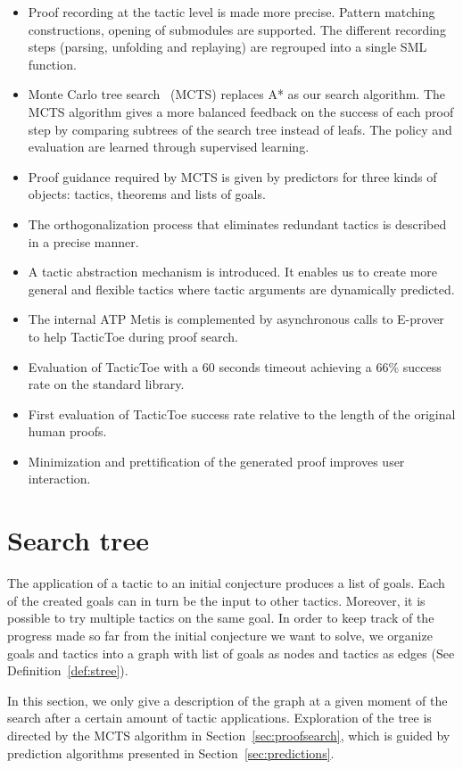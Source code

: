 \documentclass[runningheads,a4paper,draft]{svjour3}
\def\eprover{\textsf{E-prover}\xspace}
\def\sml{\textsf{SML}\xspace}
\def\metis{\textsf{Metis}\xspace}
\def\tactictoe{\textsf{TacticToe}\xspace}
\begin{document}
\begin{itemize}
\item Proof recording at the tactic level is made more precise. Pattern
matching constructions, opening of submodules are supported. The different
recording steps (parsing, unfolding and replaying) are regrouped into a single
\sml function.
\item Monte Carlo tree search~\cite{montecarlo} (MCTS) replaces A* as our
search algorithm. The MCTS algorithm gives a more balanced feedback on
the success of
each proof step by
comparing subtrees of the search tree instead of leafs. The policy and
evaluation are learned
through supervised learning.
\item Proof guidance required by MCTS is given by predictors for
three kinds of objects: tactics, theorems and lists of goals.
\item The orthogonalization process that eliminates redundant tactics is
described in a precise manner.
\item A tactic abstraction mechanism is introduced. It enables us to create
more general and flexible tactics where tactic arguments are dynamically
predicted.
\item The internal ATP \metis is complemented
by asynchronous calls to \eprover to help \tactictoe during proof search.
\item Evaluation of \tactictoe with a 60 seconds timeout achieving a 66\%
success rate on the standard library.
\item First evaluation of \tactictoe success rate relative to
the length of the original human proofs.
\item Minimization and prettification of the generated proof improves user
interaction.
\end{itemize}


\section{Search tree}\label{sec:prelim}

The application of a tactic to an initial conjecture produces a list of goals.
Each of the created goals can in turn be the input to other tactics.
Moreover, it is possible to try multiple tactics on the same goal.
In order to keep track of the progress made so far from the initial conjecture we want to solve, we organize goals and tactics into a graph with list of goals as nodes and tactics as edges (See Definition~\ref{def:stree}).

In this section, we only give a description of the graph at a given
moment of the search after a certain amount of tactic applications.
Exploration of the tree is directed by the MCTS algorithm in
Section~\ref{sec:proofsearch}, which is guided by prediction algorithms
presented in Section~\ref{sec:predictions}.
\end{document}
